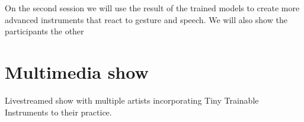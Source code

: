 On the second session we will use the result of the trained models to create more advanced instruments that react to gesture and speech. We will also show the participants the other 
 

\section{Multimedia show}

Livestreamed show with multiple artists incorporating Tiny Trainable Instruments to their practice.

